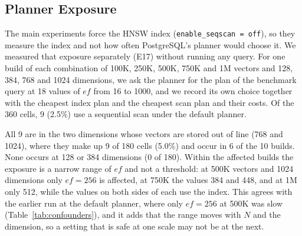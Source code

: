 \documentclass[preprint,12pt]{elsarticle}
\begin{document}
\subsection{Planner Exposure}
\label{sec:planner}

The main experiments force the HNSW index (\texttt{enable\_seqscan = off}), so they measure
the index and not how often PostgreSQL's planner would choose it. We measured that exposure
separately (E17) without running any query. For one build of each combination of 100K, 250K,
500K, 750K and 1M vectors and 128, 384, 768 and 1024 dimensions, we ask the planner for the
plan of the benchmark query at 18 values of $ef$ from 16 to 1000, and we record its own
choice together with the cheapest index plan and the cheapest scan plan and their costs. Of
the 360 cells, 9 (2.5\%) use a sequential scan under the default planner.

All 9 are in the two dimensions whose vectors are stored out of line (768 and 1024), where
they make up 9 of 180 cells (5.0\%) and occur in 6 of the 10 builds. None occurs at 128 or
384 dimensions (0 of 180). Within the affected builds the exposure is a narrow range of
$ef$ and not a threshold: at 500K vectors and 1024 dimensions only $ef=256$ is affected, at
750K the values 384 and 448, and at 1M only 512, while the values on both sides of each use
the index. This agrees with the earlier run at the default planner, where only $ef=256$ at
500K was slow (Table~\ref{tab:confounders}), and it adds that the range moves with $N$
and the dimension, so a setting that is safe at one scale may not be at the next.
\end{document}
